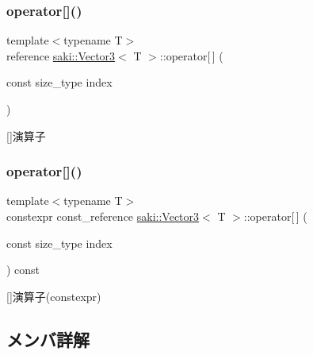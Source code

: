 \subsubsection{\texorpdfstring{operator[]()}{operator[]()}\hspace{0.1cm}{\footnotesize\ttfamily [1/2]}}
{\footnotesize\ttfamily template$<$typename T$>$ \\
reference \mbox{\hyperlink{classsaki_1_1_vector3}{saki\+::\+Vector3}}$<$ T $>$\+::operator\mbox{[}$\,$\mbox{]} (\begin{DoxyParamCaption}\item[{const size\+\_\+type}]{index }\end{DoxyParamCaption})\hspace{0.3cm}{\ttfamily [inline]}}



\mbox{[}\mbox{]}演算子 

\mbox{\label{classsaki_1_1_vector3_a600c14dfc11800251ed90b2346a70490}} 
\subsubsection{\texorpdfstring{operator[]()}{operator[]()}\hspace{0.1cm}{\footnotesize\ttfamily [2/2]}}
{\footnotesize\ttfamily template$<$typename T$>$ \\
constexpr const\+\_\+reference \mbox{\hyperlink{classsaki_1_1_vector3}{saki\+::\+Vector3}}$<$ T $>$\+::operator\mbox{[}$\,$\mbox{]} (\begin{DoxyParamCaption}\item[{const size\+\_\+type}]{index }\end{DoxyParamCaption}) const\hspace{0.3cm}{\ttfamily [inline]}}



\mbox{[}\mbox{]}演算子(constexpr) 



\subsection{メンバ詳解}
\mbox{\label{classsaki_1_1_vector3_ab33de1bb371f0175349847e95cee081d}} 
